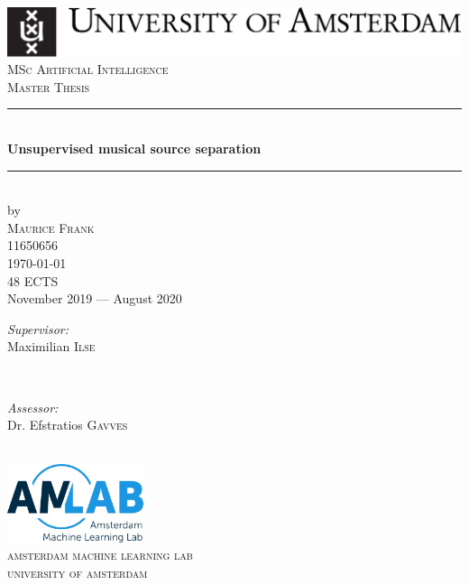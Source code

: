 \begin{titlepage}
\begin{fullwidth}
\newcommand{\HRule}{\rule{\linewidth}{0.5mm}} %

\center %
\includegraphics[width=0.8\linewidth]{../data/images/uva_logo}\\[2.5cm]

\textsc{\Large MSc Artificial Intelligence}\\[0.2cm]
\textsc{\Large Master Thesis}\\[0.5cm]

\HRule \\[0.4cm]
{\huge \bfseries Unsupervised musical source separation}\\[0.4cm] %
\HRule \\[0.5cm]


by\\[0.2cm]
\textsc{\Large Maurice Frank}\\[0.2cm]
11650656\\[1cm]

{\Large \today}\\[1cm]
48 ECTS\\ %

November 2019 --- August 2020\\[1cm]%

\begin{minipage}[t]{0.5\textwidth}
\begin{flushleft} \large
\emph{Supervisor:} \\
Maximilian \textsc{Ilse}
\end{flushleft}
\end{minipage}
~
\begin{minipage}[t]{0.5\textwidth}
\begin{flushright} \large
\emph{Assessor:} \\
Dr. Efstratios \textsc{Gavves}\\
\end{flushright}
\end{minipage}\\[2cm]


\includegraphics[width=4cm]{../data/images/amlab.eps}\\[1cm]
\textsc{\large amsterdam machine learning lab\\university of amsterdam}\\[1.0cm] %
\vfill %
\end{fullwidth}
\end{titlepage}
